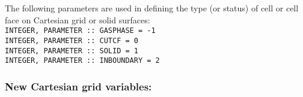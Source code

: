 \documentclass[12pt]{article}
\begin{document}
The following parameters are used in defining the type (or status) of cell or cell face on Cartesian grid or solid surfaces: \\
\texttt{INTEGER, PARAMETER :: GASPHASE     = -1} \\
\texttt{INTEGER, PARAMETER :: CUTCF         =   0} \\
\texttt{INTEGER, PARAMETER :: SOLID              =   1} \\
\texttt{INTEGER, PARAMETER :: INBOUNDARY =   2} \\



\subsubsection*{New Cartesian grid variables:}
\end{document}
